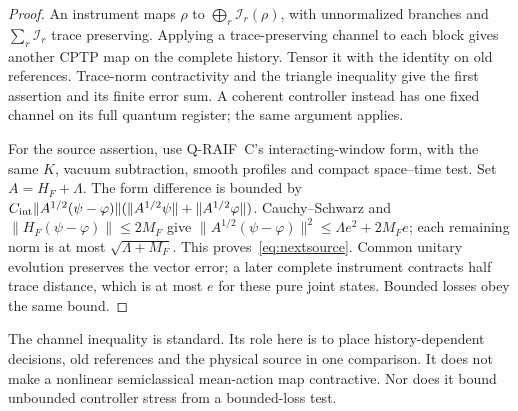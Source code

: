 \begin{proof}
An instrument maps $\rho$ to
$\bigoplus_r\mathcal I_r(\rho)$, with unnormalized branches and
$\sum_r\mathcal I_r$ trace preserving. Applying a trace-preserving
channel to each block gives another CPTP map on the complete history.
Tensor it with the identity on old references. Trace-norm
contractivity and the triangle inequality give the first assertion
and its finite error sum. A coherent controller instead has one
fixed channel on its full quantum register; the same argument applies.

For the source assertion, use Q-RAIF~C's interacting-window form,
with the same $K$, vacuum subtraction, smooth profiles and compact
space--time test. Set $A=H_F+\Lambda$.
The form difference is bounded by
$C_{\rm int}\|A^{1/2}(\psi-\varphi)\|
(\|A^{1/2}\psi\|+\|A^{1/2}\varphi\|)$.
Cauchy--Schwarz and
$\|H_F(\psi-\varphi)\|\le2M_F$ give
$\|A^{1/2}(\psi-\varphi)\|^2\le\Lambda e^2+2M_Fe$;
each remaining norm is at most $\sqrt{\Lambda+M_F}$.
This proves~\eqref{eq:nextsource}. Common unitary evolution preserves
the vector error; a later complete instrument contracts half trace
distance, which is at most $e$ for these pure joint states. Bounded
losses obey the same bound.
\end{proof}

The channel inequality is standard. Its role here is to place
history-dependent decisions, old references and the physical source
in one comparison. It does not make a nonlinear semiclassical
mean-action map contractive. Nor does it bound unbounded controller
stress from a bounded-loss test.

